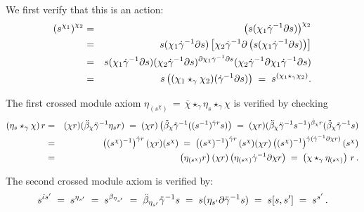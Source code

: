 \begin{pf}
We first verify that this is an action:
\begin{eqnarray*} 
\left( s^{\chi_1} \right)^{\chi_2} 
  & = & \left( s(\chi_1 \dot{\gamma}^{-1} \partial s) \right)^{\chi_2} \\ 
  & = & s (\chi_1 \dot{\gamma}^{-1} \partial s) \left[ \chi_2 \dot{\gamma}^{-1} \partial  \left( s(\chi_1 \dot{\gamma}^{-1} \partial s) \right) \right] \\
  & = & s (\chi_1 \dot{\gamma}^{-1} \partial s) (\chi_2 \dot{\gamma}^{-1} \partial s)^{\partial \chi_1 \dot{\gamma}^{-1} \partial s} 
                   (\chi_2 \dot{\gamma}^{-1} \partial \chi_1 \dot{\gamma}^{-1} \partial s) \\ 
  & = & s \left( (\chi_1 \star_{\gamma} \chi_2) (\dot{\gamma}^{-1} \partial s) \right) 
  \; = \;  s^{(\chi_1 \star_{\gamma} \chi_2)}. 
\end{eqnarray*} 

\noindent
The first crossed module axiom 
$\eta_{(s^{\chi})} \,=\, 
 \overline{\chi} \star_{\gamma} \eta_s \star_{\gamma} \chi$
is verified by checking 
\begin{eqnarray*} 
(\eta_s \star_{\gamma} \chi)\,r
  & = &  (\chi r)(\ddot{\beta}_{\chi} \ddot{\gamma}^{-1} \eta_s r) 
  \;=\;  (\chi r)\left(\ddot{\beta}_{\chi}\ddot{\gamma}^{-1}((s^{-1})^{\dot{\gamma} r}s)\right)  
  \;=\;  (\chi r)(\ddot{\beta}_{\chi}\ddot{\gamma}^{-1}s^{-1})^{\dot{\beta}_{\chi}r} 
           (\ddot{\beta}_{\chi}\ddot{\gamma}^{-1}s) \\
  & = &  \left((s^{\chi})^{-1}\right)^{\dot{\gamma} r}(\chi r)(s^{\chi}) 
  \;=\;  \left((s^{\chi})^{-1}\right)^{\dot{\gamma} r}
            (s^{\chi})(\chi r)
            \left((s^{\chi})^{-1}\right)^{\dot{\gamma}(\dot{\gamma}^{-1}\partial\chi r)} 
            (s^{\chi}) \\  
  & = &  \left(\eta_{(s^{\chi})}r\right)(\chi r)
           \left(\eta_{(s^{\chi})}\dot{\gamma}^{-1}\partial\chi r\right) 
  \;=\;  \left(\chi \star_{\gamma} \eta_{(s^{\chi})}\right)\,r\,.
\end{eqnarray*}

\noindent
The second crossed module axiom is verified by:
$$ 
s^{\ddot{\iota} s^{\prime}} 
  \;=\; s^{\eta_{s'}} 
  \;=\; s^{\beta_{\eta_{s'}}} 
  \;=\; \ddot{\beta}_{\eta_{s'}} \ddot{\gamma}^{-1} s 
  \;=\; s(\eta_{s'} \partial \ddot{\gamma}^{-1} s) 
  \;=\; s[s,s'] 
  \;=\; s^{s'}\,. 
$$ 
\end{pf}

